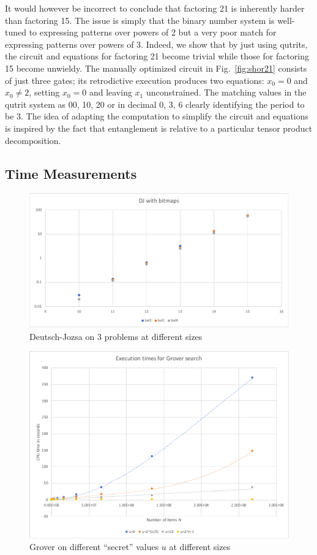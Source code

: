 \documentclass[sigplan,screen]{acmart}
\theoremstyle{definition}
\begin{document}
It would however be incorrect to conclude that factoring 21 is
inherently harder than factoring 15. The issue is simply that the
binary number system is well-tuned to expressing patterns over powers
of 2 but a very poor match for expressing patterns over powers of
3. Indeed, we show that by just using qutrits, the circuit and
equations for factoring 21 become trivial while those for factoring 15
become unwieldy. The manually optimized circuit in
Fig.~\ref{fig:shor21} consists of just three gates; its retrodictive
execution produces two equations: $x_0=0$ and $x_0 \neq 2$, setting
$x_0=0$ and leaving $x_1$ unconstrained. The matching values in the
qutrit system as 00, 10, 20 or in decimal 0, 3, 6 clearly identifying
the period to be 3. The idea of adapting the computation to simplify
the circuit and equations is inspired by the fact that entanglement is
relative to a particular tensor product decomposition.

\subsection{Time Measurements}

\begin{figure}
 \includegraphics[scale=0.4]{../execution/RetroPE/DJ.pdf}
  \caption{\label{fig:DJ} Deutsch-Jozsa on $3$ problems at different sizes}
\end{figure}

\begin{figure}
\includegraphics[scale=0.4]{../execution/RetroPE/grover.pdf}
  \caption{\label{fig:GroverWC} Grover on different ``secret'' values $u$ at different sizes}
\end{figure}
\end{document}
